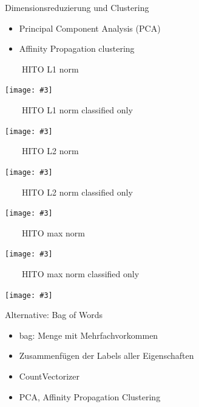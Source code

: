 \documentclass[aspectratio=1610,handout]{beamer}
\newcommand{\imageslide}[4][]
{
\begin{frame}[plain]{~~~~#2}
\vspace{0.2em}
\begin{center}
\centering\texttt{[image: \#3]}
\end{center}
#1
\note{#4}
\end{frame}
}
\begin{document}

\begin{frame}{Dimensionsreduzierung und Clustering}
\begin{itemize}
\item Principal Component Analysis (PCA)
\item Affinity Propagation clustering
\end{itemize}
\end{frame}

\imageslide{HITO L1 norm}{img/cluster-l1.pdf}{}
\imageslide{HITO L1 norm classified only}{img/cluster-classifiedonly-l1.pdf}{}
\imageslide{HITO L2 norm}{img/cluster-l2.pdf}{}
\imageslide{HITO L2 norm classified only}{img/cluster-classifiedonly-l2.pdf}{}
\imageslide{HITO max norm}{img/cluster-max.pdf}{}
\imageslide{HITO max norm classified only}{img/cluster-classifiedonly-max.pdf}{}


\begin{frame}{Alternative: Bag of Words}
\begin{itemize}
\item bag: Menge mit Mehrfachvorkommen
\item Zusammenfügen der Labels aller Eigenschaften
\item CountVectorizer
\item PCA, Affinity Propagation Clustering
\end{itemize}
\end{frame}
\end{document}
